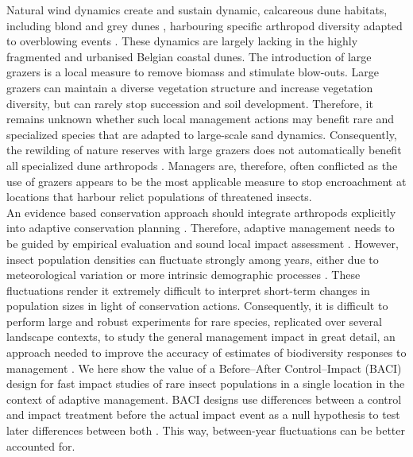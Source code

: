 \documentclass[10pt, twoside]{book} %
\begin{document}
	Natural wind dynamics create and sustain dynamic, calcareous dune habitats, including blond and grey dunes \citep{provoost2004, provoost2011}, harbouring specific arthropod diversity adapted to overblowing events \citep{bonte2002, bonte2005}. These dynamics are largely lacking in the highly fragmented and urbanised Belgian coastal dunes. The introduction of large grazers is a local measure to remove biomass and stimulate blow-outs. Large grazers can maintain a diverse vegetation structure and increase vegetation diversity, but can rarely stop succession and soil development. Therefore, it remains unknown whether such local management actions may benefit rare and specialized species that are adapted to large-scale sand dynamics. Consequently, the rewilding of nature reserves with large grazers does not automatically benefit all specialized dune arthropods \citep{vanklink2018}. Managers are, therefore, often conflicted as the use of grazers appears to be the most applicable measure to stop encroachment at locations that harbour relict populations of threatened insects.\\
	
	An evidence based conservation approach should integrate arthropods explicitly into adaptive conservation planning \citep{sutherland2004, ferraro2006, samways2020}. Therefore, adaptive management needs to be guided by empirical evaluation and sound local impact assessment \citep{sutherland2020}. However, insect population densities can fluctuate strongly among years, either due to meteorological variation or more intrinsic demographic processes \citep{didham2020, welti2021}. These fluctuations render it extremely difficult to interpret short-term changes in population sizes in light of conservation actions. Consequently, it is difficult to perform large and robust experiments for rare species, replicated over several landscape contexts, to study the general management impact in great detail, an approach needed to improve the accuracy of estimates of biodiversity responses to management \citep{christie2019}. We here show the value of a Before--After Control--Impact (BACI) design for fast impact studies of rare insect populations in a single location in the context of adaptive management. BACI designs use differences between a control and impact treatment before the actual impact event as a null hypothesis to test later differences between both \citep{thiault2017}. This way, between-year fluctuations can be better accounted for.\\
	
\end{document}
